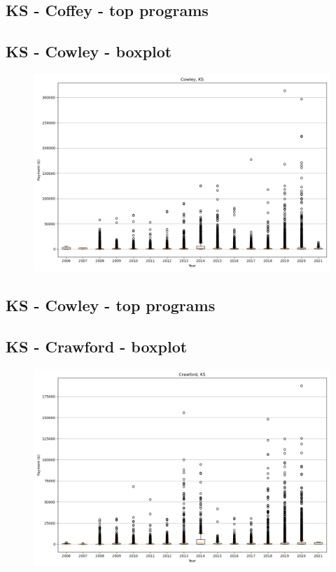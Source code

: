\subsection*{KS - Coffey - top programs}

\newpage
\subsection*{KS - Cowley - boxplot}
\begin{figure}[h]
\centering
\includegraphics[width=7in]{../output/boxplots/counties/Cowley-KS_boxplot.png}
\end{figure}


\subsection*{KS - Cowley - top programs}

\newpage
\subsection*{KS - Crawford - boxplot}
\begin{figure}[h]
\centering
\includegraphics[width=7in]{../output/boxplots/counties/Crawford-KS_boxplot.png}
\end{figure}


